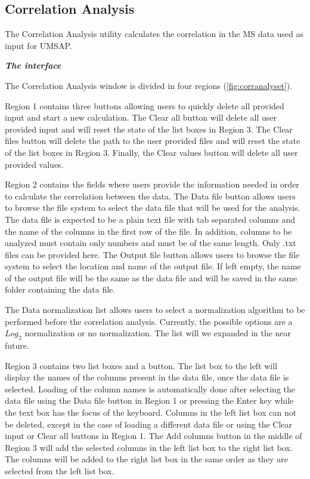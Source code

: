 \subsection{Correlation Analysis}

The Correlation Analysis utility calculates the correlation in the MS data used as input for UMSAP.

\textit{\textbf{The interface}}

The Correlation Analysis window is divided in four regions (\autoref{fig:corranalyset}). 

Region \num{1} contains three buttons allowing users to quickly delete all provided input and start a new calculation. The Clear all button will delete all user provided input and will reset the state of the list boxes in Region \num{3}. The Clear files button will delete the path to the user provided files and will reset the state of the list boxes in Region \num{3}. Finally, the Clear values button will delete all user provided values.

Region \num{2} contains the fields where users provide the information needed in order to calculate the correlation between the data. The Data file button allows users to browse the file system to select the data file that will be used for the analysis. The data file is expected to be a plain text file with tab separated columns and the name of the columns in the first row of the file. In addition, columns to be analyzed must contain only numbers and must be of the same length. Only .txt files can be provided here. The Output file button allows users to browse the file system to select the location and name of the output file. If left empty, the name of the output file will be the same as the data file and will be saved in the same folder containing the data file. 

The Data normalization list allows users to select a normalization algorithm to be performed before the correlation analysis. Currently, the possible options are a $Log_{2}$ normalization or no normalization. The list will we expanded in the near future.

Region \num{3} contains two list boxes and a button. The list box to the left will display the names of the columns present in the data file, once the data file is selected. Loading of the column names is automatically done after selecting the data file using the Data file button in Region \num{1} or pressing the Enter key while the text box has the focus of the keyboard. Columns in the left list box can not be deleted, except in the case of loading a different data file or using the Clear input or Clear all buttons in Region \num{1}. The Add columns button in the middle of Region \num{3} will add the selected columns in the left list box to the right list box. The columns will be added to the right list box in the same order as they are selected from the left list box. 

